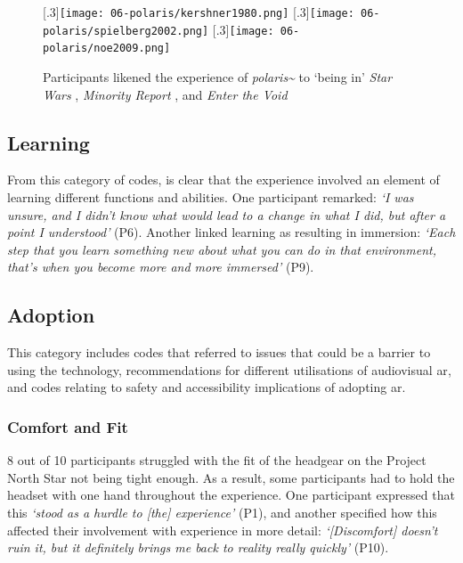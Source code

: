 \begin{figure}
    \centering
    \captionsetup{justification=centering, margin=1.5cm}
    [.3\linewidth]{\texttt{[image: 06-polaris/kershner1980.png]}}
    \hfill
    [.3\linewidth]{\texttt{[image: 06-polaris/spielberg2002.png]}}
    \hfill
    [.3\linewidth]{\texttt{[image: 06-polaris/noe2009.png]}}
    \caption{Participants likened the experience of \textit{polaris\textasciitilde{}} to `being in' \textit{Star Wars} , \textit{Minority Report} , and \textit{Enter the Void} }\label{fig: films}
\end{figure}

\subsection{Learning}\label{sec: polaris-feedback-learning}
From this category of codes, is clear that the experience involved an element of learning different functions and abilities. One participant remarked: \textit{`I was unsure, and I didn't know what would lead to a change in what I did, but after a point I understood'} (P6). Another linked learning as resulting in immersion: \textit{`Each step that you learn something new about what you can do in that environment, that's when you become more and more immersed'} (P9).

\subsection{Adoption}\label{sec: polaris-feedback-adoption}
This category includes codes that referred to issues that could be a barrier to using the technology, recommendations for different utilisations of audiovisual \gls{ar}, and codes relating to safety and accessibility implications of adopting \gls{ar}.

\subsubsection{Comfort and Fit}\label{sec: polaris-feedback-adoption-comfort}
8 out of 10 participants struggled with the fit of the headgear on the Project North Star not being tight enough. As a result, some participants had to hold the headset with one hand throughout the experience. One participant expressed that this \textit{`stood as a hurdle to [the] experience'} (P1), and another specified how this affected their involvement with experience in more detail: \textit{`[Discomfort] doesn't ruin it, but it definitely brings me back to reality really quickly'} (P10).
